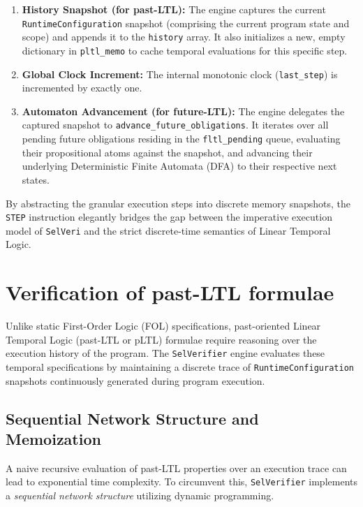 \documentclass{article}
\begin{document}
\begin{enumerate}
    \item \textbf{History Snapshot (for past-LTL):} The engine captures the current \texttt{RuntimeConfiguration} snapshot (comprising the current program state and scope) and appends it to the \texttt{history} array. It also initializes a new, empty dictionary in \texttt{pltl\_memo} to cache temporal evaluations for this specific step.
    
    \item \textbf{Global Clock Increment:} The internal monotonic clock (\texttt{last\_step}) is incremented by exactly one.
    
    \item \textbf{Automaton Advancement (for future-LTL):} The engine delegates the captured snapshot to \texttt{advance\_future\_obligations}. It iterates over all pending future obligations residing in the \texttt{fltl\_pending} queue, evaluating their propositional atoms against the snapshot, and advancing their underlying Deterministic Finite Automata (DFA) to their respective next states.
\end{enumerate}

By abstracting the granular execution steps into discrete memory snapshots, the \texttt{STEP} instruction elegantly bridges the gap between the imperative execution model of \texttt{SelVeri} and the strict discrete-time semantics of Linear Temporal Logic.

\newpage
\section{Verification of past-LTL formulae}

Unlike static First-Order Logic (FOL) specifications, past-oriented Linear Temporal Logic (past-LTL or pLTL) formulae require reasoning over the execution history of the program. The \texttt{SelVerifier} engine evaluates these temporal specifications by maintaining a discrete trace of \texttt{RuntimeConfiguration} snapshots continuously generated during program execution.

\subsection{Sequential Network Structure and Memoization}
A naive recursive evaluation of past-LTL properties over an execution trace can lead to exponential time complexity. To circumvent this, \texttt{SelVerifier} implements a \textit{sequential network structure} utilizing dynamic programming. 
\end{document}
